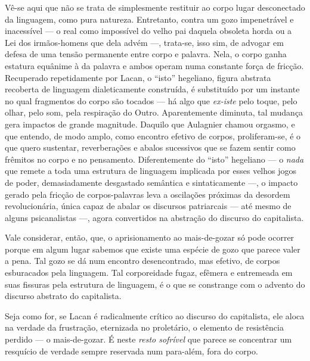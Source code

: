 Vê-se aqui que não se trata de simplesmente restituir ao corpo lugar
desconectado da linguagem, como pura natureza. Entretanto, contra um
gozo impenetrável e inacessível --- o real como impossível do velho pai
daquela obsoleta horda ou a Lei dos irmãos-homens que dela advém ---,
trata-se, isso sim, de advogar em defesa de uma tensão permanente entre
corpo e palavra. Nela, o corpo ganha estatura equânime à da palavra e
ambos operam numa constante força de fricção. Recuperado repetidamente
por Lacan, o ``isto'' hegeliano, figura abstrata recoberta de linguagem
dialeticamente construída, é substituído por um instante no qual
fragmentos do corpo são tocados --- há algo que \emph{ex-iste} pelo
toque, pelo olhar, pelo som, pela respiração do Outro. Aparentemente
diminuta, tal mudança gera impactos de grande magnitude. Daquilo que
Aulagnier chamou orgasmo, e que entendo, de modo amplo, como encontro
efetivo de corpos, proliferam-se, é o que quero sustentar, reverberações
e abalos sucessivos que se fazem sentir como frêmitos no corpo e no
pensamento. Diferentemente do ``isto'' hegeliano --- o \emph{nada} que
remete a toda uma estrutura de linguagem implicada por esses velhos
jogos de poder, demasiadamente desgastado semântica e sintaticamente ---,
o impacto gerado pela fricção de corpos-palavras leva a oscilações
próximas da desordem revolucionária, única capaz de abalar os discursos
patriarcais --- até mesmo de alguns psicanalistas ---, agora convertidos
na abstração do discurso do capitalista.

\asterisc

Vale considerar, então, que, o aprisionamento ao mais-de-gozar só pode
ocorrer porque em algum lugar sabemos que existe uma espécie de gozo que
parece valer a pena. Tal gozo se dá num encontro desencontrado, mas
efetivo, de corpos esburacados pela linguagem. Tal corporeidade fugaz,
efêmera e entremeada em suas fissuras pela estrutura de linguagem, é o
que se constrange com o advento do discurso abstrato do capitalista.

Seja como for, se Lacan é radicalmente crítico ao discurso do
capitalista, ele aloca na verdade da frustração, eternizada no
proletário, o elemento de resistência perdido --- o mais-de-gozar. É
neste \emph{resto sofrível} que parece se concentrar um resquício de
verdade sempre reservada num para-além, fora do corpo.

